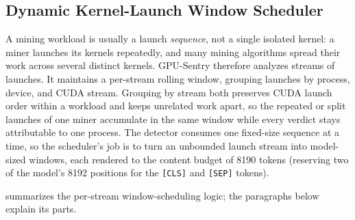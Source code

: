 \subsection{Dynamic Kernel-Launch Window Scheduler}
\label{sec:windows}

A mining workload is usually a launch \emph{sequence}, not a single isolated kernel: a miner launches its kernels repeatedly, and many mining algorithms spread their work across several distinct kernels. GPU-Sentry therefore analyzes streams of launches. It maintains a per-stream rolling window, grouping launches by process, device, and CUDA stream. Grouping by stream both preserves CUDA launch order within a workload and keeps unrelated work apart, so the repeated or split launches of one miner accumulate in the same window while every verdict stays attributable to one process. The detector consumes one fixed-size sequence at a time, so the scheduler's job is to turn an unbounded launch stream into model-sized windows, each rendered to the content budget of 8190 tokens (reserving two of the model's 8192 positions for the \texttt{[CLS]} and \texttt{[SEP]} tokens).

 summarizes the per-stream window-scheduling logic; the paragraphs below explain its parts.

